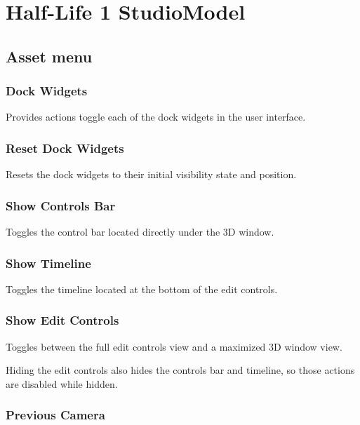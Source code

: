 \documentclass[10pt, a4paper, titlepage, oneside]{article}
\begin{document}
\newpage

\section{Half-Life 1 StudioModel}
\label{sec:hl1studiomodel}

\subsection{Asset menu}

\subsubsection{Dock Widgets}

Provides actions toggle each of the dock widgets in the user interface.

\subsubsection{Reset Dock Widgets}

Resets the dock widgets to their initial visibility state and position.

\subsubsection{Show Controls Bar}

Toggles the control bar located directly under the 3D window.

\subsubsection{Show Timeline}

Toggles the timeline located at the bottom of the edit controls.

\subsubsection{Show Edit Controls}

Toggles between the full edit controls view and a maximized 3D window view.

Hiding the edit controls also hides the controls bar and timeline, so those actions are disabled while hidden.

\subsubsection{Previous Camera}
\end{document}

